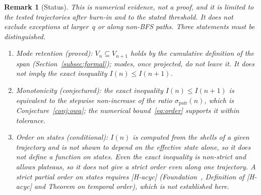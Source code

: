 \documentclass[11pt,a4paper]{article}
\newtheorem{remark}{Remark}
\begin{document}
    \begin{remark}[Status]
        This is numerical evidence, not a proof, and it is limited to the tested
        trajectories after burn-in and to the stated threshold.
        It does not exclude exceptions at larger~$q$ or along non-BFS paths.
        Three statements must be distinguished.
        \begin{enumerate}
          \item \emph{Mode retention} (proved): $V_n \subseteq V_{n+1}$ holds by
          the cumulative definition of the span (Section~\ref{subsec:formal});
          modes, once projected, do not leave it.
          It does not imply the exact inequality $I(n) \leq I(n+1)$.
          \item \emph{Monotonicity} (conjectured): the exact inequality
          $I(n) \leq I(n+1)$ is equivalent to the stepwise non-increase of the
          ratio $\sigma_{\mathrm{pair}}(n)$, which is Conjecture~\ref{conj:owa};
          the numerical bound~\eqref{eq:order} supports it within tolerance.
          \item \emph{Order on states} (conditional): $I(n)$ is computed from the
          shells of a given trajectory and is not shown to depend on the
          effective state alone, so it does not define a function on states.
          Even the exact inequality is non-strict and allows plateaus, so it
          does not give a strict order even along one trajectory.
          A strict partial order on states requires [H-acyc]
          (Foundation~\cite{Beau2026m}, Definition of [H-acyc] and Theorem on temporal
          order), which is not established here.
        \end{enumerate}
    \end{remark}
\end{document}
